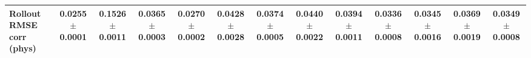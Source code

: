 \begin{table}[t]
{\begin{tabular}{lcccccccccccc}
Rollout RMSE corr (phys) & \makecell{\textbf{0.0255}\\[-2pt]{\scriptsize$\pm$0.0001}} & \makecell{0.1526\\[-2pt]{\scriptsize$\pm$0.0011}} & \makecell{0.0365\\[-2pt]{\scriptsize$\pm$0.0003}} & \makecell{0.0270\\[-2pt]{\scriptsize$\pm$0.0002}} & \makecell{0.0428\\[-2pt]{\scriptsize$\pm$0.0028}} & \makecell{0.0374\\[-2pt]{\scriptsize$\pm$0.0005}} & \makecell{0.0440\\[-2pt]{\scriptsize$\pm$0.0022}} & \makecell{0.0394\\[-2pt]{\scriptsize$\pm$0.0011}} & \makecell{0.0336\\[-2pt]{\scriptsize$\pm$0.0008}} & \makecell{0.0345\\[-2pt]{\scriptsize$\pm$0.0016}} & \makecell{0.0369\\[-2pt]{\scriptsize$\pm$0.0019}} & \makecell{0.0349\\[-2pt]{\scriptsize$\pm$0.0008}} \\
\bottomrule
\end{tabular}}
\end{table}